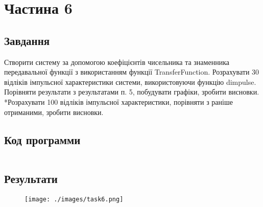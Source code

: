 \section{Частина 6}
\label{sec:task6}

\subsection{Завдання}
\label{subsec:task6_task}

Створити систему за допомогою коефіцієнтів чисельника та
знаменника передавальної функції з використанням функції TransferFunction.
Розрахувати 30 відліків імпульсної характеристики системи, використовуючи
функцію dimpulse. Порівняти результати з результатами п. 5, побудувати
графіки, зробити висновки.
*Розрахувати 100 відліків імпульсної характеристики, порівняти з
раніше отриманими, зробити висновки.

\subsection{Код программи}
\label{subsec:task6_code}
\inputminted{python}{../src/task6.py}

\subsection{Результати}
\label{subsec:task6_results}

\begin{figure}[!ht]
    \centering
    \texttt{[image: ./images/task6.png]}
\end{figure}
